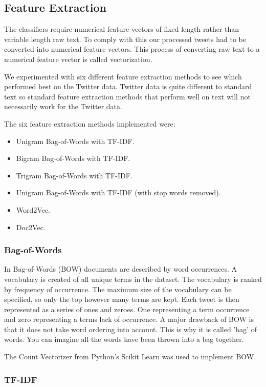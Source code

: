 \subsection*{Feature Extraction}

The classifiers require numerical feature vectors of fixed length rather than variable length raw text. To comply with this our processed tweets had to be converted into numerical feature vectors. This process of converting raw text to a numerical feature vector is called vectorization.

We experimented with six different feature extraction methods to see which performed best on the Twitter data. Twitter data is quite different to standard text so standard feature extraction methods that perform well on text will not necessarily work for the Twitter data.

The six feature extraction methods implemented were:
\begin{itemize}
    \item Unigram Bag-of-Words with TF-IDF.
    \item Bigram Bag-of-Words with TF-IDF.
    \item Trigram Bag-of-Words with TF-IDF.
    \item Unigram Bag-of-Words with TF-IDF (with stop words removed).
    \item Word2Vec.
    \item Doc2Vec.
\end{itemize}

\subsubsection{Bag-of-Words}

In Bag-of-Words (BOW) documents are described by word occurrences. A vocabulary is created of all unique terms in the dataset. The vocabulary is ranked by frequency of occurrence. The maximum size of the vocabulary can be specified, so only the top however many terms are kept. Each tweet is then represented as a series of ones and zeroes. One representing a term occurrence and zero representing a terms lack of occurrence. A major drawback of BOW is that it does not take word ordering into account. This is why it is called 'bag' of words. You can imagine all the words have been thrown into a bag together.

The Count Vectorizer from Python's Scikit Learn was used to implement BOW. 

\subsubsection{TF-IDF}

